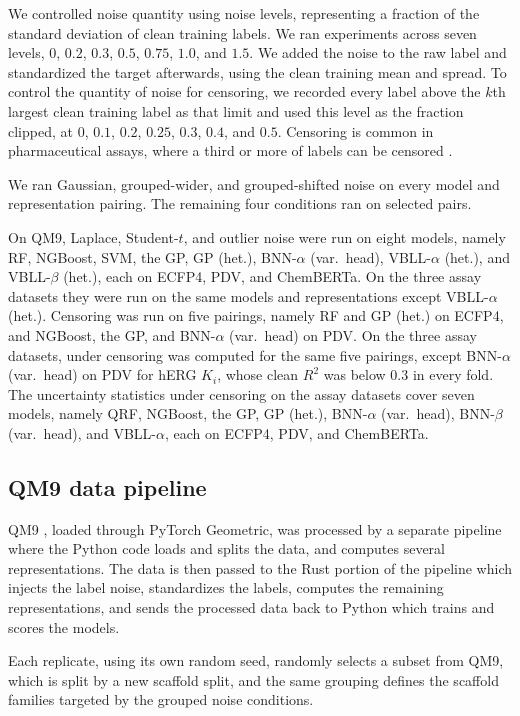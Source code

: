 We controlled noise quantity using noise levels, representing a fraction of the standard deviation of clean training labels. We ran experiments across seven levels, $0$, $0.2$, $0.3$, $0.5$, $0.75$, $1.0$, and $1.5$. We added the noise to the raw label and standardized the target afterwards, using the clean training mean and spread. To control the quantity of noise for censoring, we recorded every label above the $k$th largest clean training label as that limit and used this level as the fraction clipped, at $0$, $0.1$, $0.2$, $0.25$, $0.3$, $0.4$, and $0.5$. Censoring is common in pharmaceutical assays, where a third or more of labels can be censored \citep{Svensson2025}.

We ran Gaussian, grouped-wider, and grouped-shifted noise on every model and representation pairing. The
remaining four conditions ran on selected pairs.

On QM9, Laplace, Student-$t$, and outlier noise were run on eight models, namely RF, NGBoost, SVM, the GP, GP (het.), BNN-$\alpha$ (var.\ head), VBLL-$\alpha$ (het.), and VBLL-$\beta$ (het.), each on ECFP4, PDV, and ChemBERTa. On the three assay datasets they were run on the same models and representations except VBLL-$\alpha$ (het.). Censoring was run on five pairings, namely RF and GP (het.) on ECFP4, and NGBoost, the GP, and BNN-$\alpha$ (var.\ head) on PDV. On the three assay datasets, \aucnorm{} under censoring was computed for the same five pairings, except BNN-$\alpha$ (var.\ head) on PDV for hERG $K_i$, whose clean $R^2$ was below 0.3 in every fold. The uncertainty statistics under censoring on the assay datasets cover seven models, namely QRF, NGBoost, the GP, GP (het.), BNN-$\alpha$ (var.\ head), BNN-$\beta$ (var.\ head), and VBLL-$\alpha$, each on ECFP4, PDV, and ChemBERTa.

\subsection{QM9 data pipeline}

QM9 \citep{Ramakrishnan2014}, loaded through PyTorch Geometric, was processed by a separate pipeline where the Python code loads and splits the data, and computes several representations. The data is then passed to the Rust portion of the pipeline which injects the label noise, standardizes the labels, computes the remaining representations, and sends the processed data back to Python which trains and scores the models. 

Each replicate, using its own random seed, randomly selects a subset from QM9, which is split by a new scaffold split, and the same grouping defines the scaffold families targeted by the grouped noise conditions.


